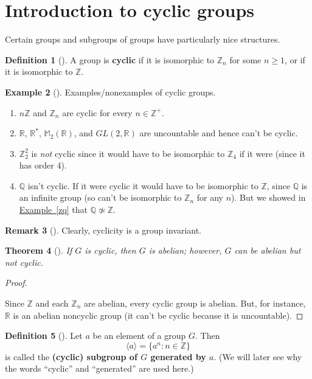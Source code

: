 \documentclass[10pt,]{book}
\newcommand{\terminology}[1]{\textbf{#1}}
\theoremstyle{plain}
\newtheorem{theorem}{Theorem}[section]
\theoremstyle{definition}
\newtheorem{definition}[theorem]{Definition}
\theoremstyle{definition}
\newtheorem{remark}[theorem]{Remark}
\theoremstyle{definition}
\newtheorem{example}[theorem]{Example}
\theoremstyle{definition}
\numberwithin{equation}{section}
\def\Z{\mathbb{Z}}
\def\R{\mathbb{R}}
\def\Q{\mathbb{Q}}
\def\M{\mathbb{M}}
\begin{document}
\section[{Introduction to cyclic groups}]{Introduction to cyclic groups}\label{cycintro}
Certain groups and subgroups of groups have particularly nice structures.%
\begin{definition}[{}]\label{definition-39}
A group is \terminology{cyclic} if it is isomorphic to \(\Z_n\) for some \(n\geq 1\), or if it is isomorphic to \(\Z\).%
\end{definition}
\begin{example}[]\label{example-43}
Examples/nonexamples of cyclic groups. \leavevmode%
\begin{enumerate}
\item\hypertarget{li-247}{}\(n\Z\) and \(\Z_n\) are cyclic for every \(n\in \Z^+\).%
\item\hypertarget{li-248}{}\(\R\), \(\R^*\), \(\M_2(\R)\), and \(GL(2,\R)\) are uncountable and hence can't be cyclic.%
\item\hypertarget{li-249}{}\(\Z_2^2\) is \emph{not} cyclic since it would have to be isomorphic to \(\Z_4\) if it were (since it has order 4).%
\item\hypertarget{li-250}{}\(\Q\) isn't cyclic. If it were cyclic it would have to be isomorphic to \(\Z\), since \(\Q\) is an infinite group (so can't be isomorphic to \(\Z_n\) for any \(n\)). But we showed in \hyperref[zq]{Example~\ref{zq}} that \(\Q \not\simeq \Z\).%
\end{enumerate}
%
\end{example}
\begin{remark}[]\label{remark-20}
Clearly, cyclicity is a group invariant.%
\end{remark}
\begin{theorem}[{}]\label{abcyc}
If \(G\) is cyclic, then \(G\) is abelian; however, \(G\) can be abelian but not cyclic.%
\end{theorem}
\begin{proof}\hypertarget{proof-21}{}
Since \(\Z\) and each \(\Z_n\) are abelian, every cyclic group is abelian. But, for instance, \(\R\) is an abelian noncyclic group (it can't be cyclic because it is uncountable).%
\end{proof}
\begin{definition}[{}]\label{definition-40}
\label{notation-54}
Let \(a\) be an element of a group \(G\). Then%
\begin{equation*}
\langle a\rangle  = \{a^n:n\in \Z\}
\end{equation*}
is called the \terminology{(cyclic) subgroup of \(G\) generated by \(a\)}. (We will later see why the words ``cyclic'' and ``generated'' are used here.)%
\end{definition}
\end{document}
